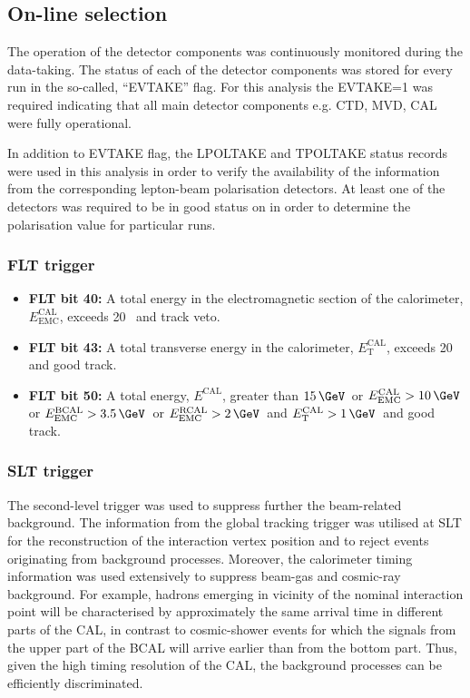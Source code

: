 \subsection{On-line selection}
\label{subsec:onlineselect}
The operation of the detector components was continuously monitored during the data-taking. The status of each of the detector components was stored for every run in the so-called, ``EVTAKE'' flag. For this analysis the EVTAKE=1 was required indicating that all main detector components e.g. CTD, MVD, CAL were fully operational.

In addition to EVTAKE flag, the LPOLTAKE and TPOLTAKE status records were used in this analysis in order to verify the availability of the information from the corresponding lepton-beam polarisation detectors. At least one of the detectors was required to be in good status on in order to determine the polarisation value for particular runs.
\subsubsection{FLT trigger}
\label{subsubsec:fltcuts}
\begin{itemize}
	\item \textbf{FLT bit 40:} A total energy in the electromagnetic section of the calorimeter, $E_\text{EMC}^\text{CAL}$, exceeds 20 \GeV\, and track veto.
	\item \textbf{FLT bit 43:} A total transverse energy in the calorimeter, $E_\text{T}^\text{CAL}$, exceeds 20 \GeV\, and good track.
	\item \textbf{FLT bit 50:} A total energy, $E^\text{CAL}$, greater than $15\, \GeV$\, or $E_\text{EMC}^\text{CAL} > 10\, \GeV\,$ or $E_\text{EMC}^\text{BCAL} > 3.5\, \GeV$\, or $E_\text{EMC}^\text{RCAL} > 2\, \GeV$\, and $E_\text{T}^\text{CAL} > 1\, \GeV$\, and good track.
\end{itemize}

\subsubsection{SLT trigger}
\label{subsubsec:sltcuts}
The second-level trigger was used to suppress further the beam-related background. The information from the \zeus global tracking trigger was utilised at SLT for the reconstruction of the interaction vertex position and to reject events originating from background processes. Moreover, the calorimeter timing information was used extensively to suppress beam-gas and cosmic-ray background. For example, hadrons emerging in vicinity of the nominal interaction point will be characterised by approximately the same arrival time in different parts of the CAL, in contrast to cosmic-shower events for which the signals from the upper part of the BCAL will arrive earlier than from the bottom part. Thus, given the high timing resolution of the CAL, the background processes can be efficiently discriminated.

